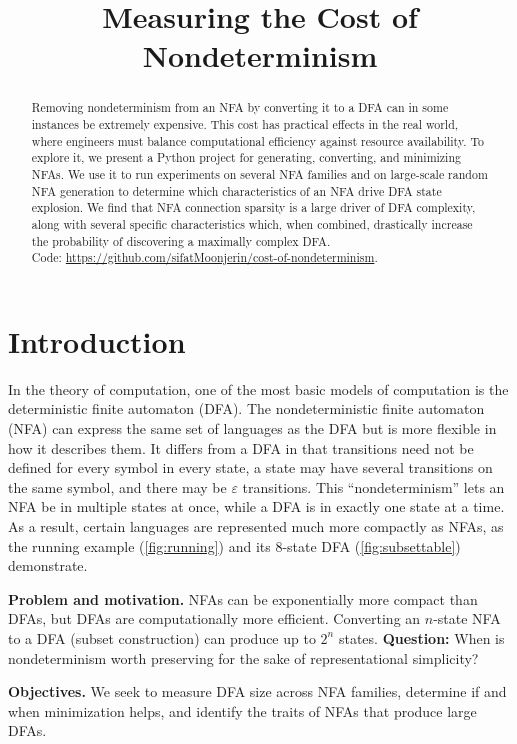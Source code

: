 \documentclass[9pt]{ieeeconf}
\title{Measuring the Cost of Nondeterminism}
\begin{document}
\maketitle

\begin{abstract}
Removing nondeterminism from an NFA by converting it to a DFA can in some instances be extremely expensive. This cost has practical effects in the real world, where engineers must balance computational efficiency against resource availability. To explore it, we present a Python project for generating, converting, and minimizing NFAs. We use it to run experiments on several NFA families and on large-scale random NFA generation to determine which characteristics of an NFA drive DFA state explosion. We find that NFA connection sparsity is a large driver of DFA complexity, along with several specific characteristics which, when combined, drastically increase the probability of discovering a maximally complex DFA.
\\
Code: \url{https://github.com/sifatMoonjerin/cost-of-nondeterminism}.
\end{abstract}

\section{Introduction}
\label{sec:intro}

In the theory of computation, one of the most basic models of computation is the deterministic finite automaton (DFA). The nondeterministic finite automaton (NFA) can express the same set of languages as the DFA but is more flexible in how it describes them. It differs from a DFA in that transitions need not be defined for every symbol in every state, a state may have several transitions on the same symbol, and there may be $\varepsilon$ transitions. This ``nondeterminism'' lets an NFA be in multiple states at once, while a DFA is in exactly one state at a time. As a result, certain languages are represented much more compactly as NFAs, as the running example (\cref{fig:running}) and its 8-state DFA (\cref{fig:subsettable}) demonstrate.

\textbf{Problem and motivation.} NFAs can be exponentially more compact than DFAs, but DFAs are computationally more efficient. Converting an $n$-state NFA to a DFA (subset construction) can produce up to $2^n$ states. \textbf{Question:} When is nondeterminism worth preserving for the sake of representational simplicity?

\textbf{Objectives.} We seek to measure DFA size across NFA families, determine if and when minimization helps, and identify the traits of NFAs that produce large DFAs.
\end{document}
